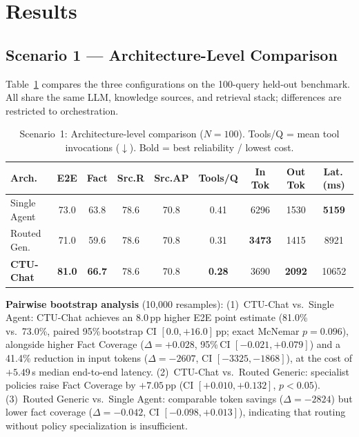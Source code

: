 \section{Results}
\label{sec:results}

\subsection{Scenario 1 --- Architecture-Level Comparison}
\label{sec:s1_results}

Table~\ref{tab:arch_comparison} compares the three configurations on the 100-query held-out benchmark. All share the same LLM, knowledge sources, and retrieval stack; differences are restricted to orchestration.

\begin{table}[!htbp]
\centering
\caption{Scenario~1: Architecture-level comparison ($N=100$). Tools/Q = mean tool invocations ($\downarrow$). Bold = best reliability / lowest cost.}
\label{tab:arch_comparison}
{\small\setlength{\tabcolsep}{3.5pt}
\begin{tabular}{lcccccccc}
\toprule
\textbf{Arch.} & \textbf{E2E} & \textbf{Fact} & \textbf{Src.R} & \textbf{Src.AP} & \textbf{Tools/Q} & \textbf{In Tok} & \textbf{Out Tok} & \textbf{Lat.\,(ms)} \\
\midrule
Single Agent   & 73.0 & 63.8 & 78.6 & 70.8 & 0.41 & 6296 & 1530 & \textbf{5159} \\
Routed Gen.    & 71.0 & 59.6 & 78.6 & 70.8 & 0.31 & \textbf{3473} & 1415 & 8921 \\
\textbf{CTU-Chat} & \textbf{81.0} & \textbf{66.7} & 78.6 & 70.8 & \textbf{0.28} & 3690 & \textbf{2092} & 10652 \\
\bottomrule
\end{tabular}}
\end{table}

\textbf{Pairwise bootstrap analysis} (10,000 resamples):
(1)~CTU-Chat vs.\ Single Agent: CTU-Chat achieves an 8.0\,pp higher E2E point estimate (81.0\% vs.\ 73.0\%, paired 95\%\,bootstrap CI $[0.0, +16.0]$\,pp; exact McNemar $p{=}0.096$), alongside higher Fact Coverage ($\Delta{=}+0.028$, 95\%\,CI $[-0.021,+0.079]$) and a 41.4\% reduction in input tokens ($\Delta{=}-2607$, CI $[-3325,-1868]$), at the cost of $+5.49$\,s median end-to-end latency.
(2)~CTU-Chat vs.\ Routed Generic: specialist policies raise Fact Coverage by $+7.05$\,pp (CI $[+0.010,+0.132]$, $p{<}0.05$).
(3)~Routed Generic vs.\ Single Agent: comparable token savings ($\Delta{=}-2824$) but lower fact coverage ($\Delta{=}-0.042$, CI $[-0.098,+0.013]$), indicating that routing without policy specialization is insufficient.

